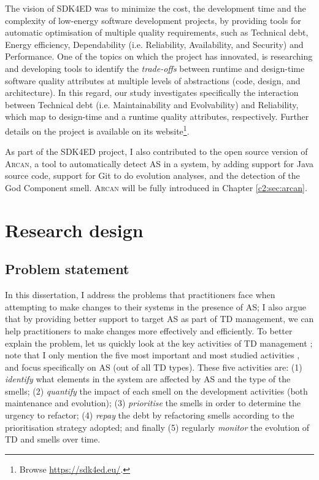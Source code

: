 The vision of SDK4ED was to minimize the cost, the development time and the complexity of low-energy software development projects, by providing tools for automatic optimisation of multiple quality requirements, such as Technical debt, Energy efficiency, Dependability (i.e. Reliability, Availability, and Security) and Performance. 
One of the topics on which the project has innovated, is researching and developing tools to identify the \textit{trade-offs} between runtime and design-time software quality attributes at multiple levels of abstractions (code, design, and architecture).
In this regard, our study investigates specifically the interaction between Technical debt (i.e. Maintainability and Evolvability) and Reliability, which map to design-time and a runtime quality attributes, respectively. Further details on the project is available on its website\footnote{Browse \url{https://sdk4ed.eu/}.}.

As part of the SDK4ED project, I also contributed to the open source version of \textsc{Arcan}, a tool to automatically detect AS in a system, by adding support for Java source code, support for Git to do evolution analyses, and the detection of the God Component smell.
\textsc{Arcan} will be fully introduced in Chapter \ref{c2:sec:arcan}.

\section{Research design}\label{sec:intro:research-design}
\subsection{Problem statement}\label{sec:intro:problem-statement}
In this dissertation, I address the problems that practitioners face when attempting to make changes to their systems in the presence of AS; I also argue that by providing better support to target AS as part of TD management, we can help practitioners to make changes more effectively and efficiently. 
To better explain the problem, let us quickly look at the key activities of TD management \cite{Li2015}; note that I only mention the five most important and most studied activities \cite{Li2015}, and focus specifically on AS (out of all TD types).
These five activities are: (1) \emph{identify} what elements in the system are affected by AS and the type of the smells; (2) \emph{quantify} the impact of each smell on the development activities (both maintenance and evolution); (3) \emph{prioritise} the smells in order to determine the urgency to refactor; (4) \emph{repay} the debt by refactoring smells according to the prioritisation strategy adopted; and finally (5) regularly \emph{monitor} the evolution of TD and smells over time.

